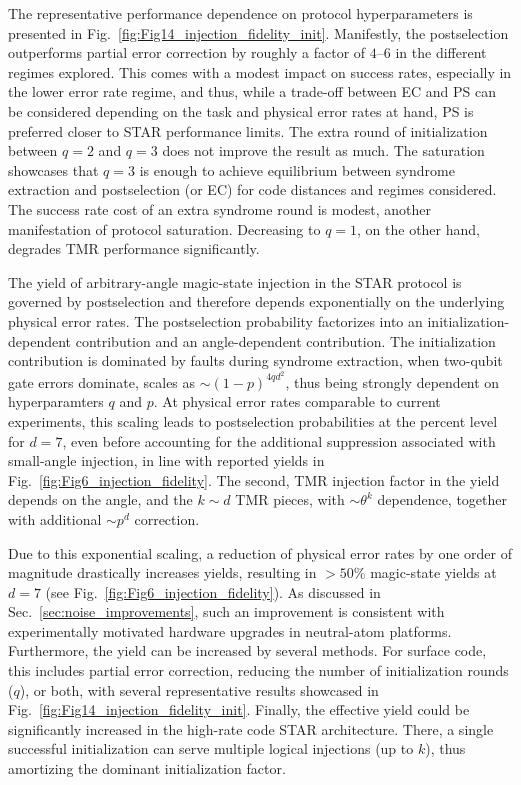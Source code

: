 \documentclass[aps, prx, reprint, superscriptaddress, longbibliography, floatfix]{revtex4-2}
\begin{document}
The representative performance dependence on protocol hyperparameters is presented in Fig.~\ref{fig:Fig14_injection_fidelity_init}. Manifestly, the postselection outperforms partial error correction by roughly a factor of $4$--$6$ in the different regimes explored. This comes with a modest impact on success rates, especially in the lower error rate regime, and thus, while a trade-off between EC and PS can be considered depending on the task and physical error rates at hand, PS is preferred closer to STAR performance limits. The extra round of initialization between $q=2$ and $q=3$ does not improve the result as much. The saturation showcases that $q=3$ is enough to achieve equilibrium between syndrome extraction and postselection (or EC) for code distances and regimes considered. The success rate cost of an extra syndrome round is modest, another manifestation of protocol saturation. Decreasing to $q=1$, on the other hand, degrades TMR performance significantly.

The yield of arbitrary-angle magic-state injection in the STAR protocol is governed by postselection and therefore depends exponentially on the underlying physical error rates. The postselection probability factorizes into an initialization-dependent contribution and an angle-dependent contribution. The initialization contribution is dominated by faults during syndrome extraction, when two-qubit gate errors dominate, scales as $\sim (1-p)^{ 4 q d^{2}}$, thus being strongly dependent on hyperparamters $q$ and $p$. At physical error rates comparable to current experiments, this scaling leads to postselection probabilities at the percent level for $d=7$, even before accounting for the additional suppression associated with small-angle injection, in line with reported yields in Fig.~\ref{fig:Fig6_injection_fidelity}. The second, TMR injection factor in the yield depends on the angle, and the $k\sim d$ TMR pieces, with $\sim \theta^{k}$ dependence, together with additional $\sim p^{d}$ correction.

Due to this exponential scaling, a reduction of physical error rates by one order of magnitude drastically increases yields, resulting in $>50\%$ magic-state yields at $d=7$ (see Fig.~\ref{fig:Fig6_injection_fidelity}). As discussed in Sec.~\ref{sec:noise_improvements}, such an improvement is consistent with experimentally motivated hardware upgrades in neutral-atom platforms. Furthermore, the yield can be increased by several methods. For surface code, this includes partial error correction, reducing the number of initialization rounds ($q$), or both, with several representative results showcased in Fig.~\ref{fig:Fig14_injection_fidelity_init}. Finally, the effective yield could be significantly increased in the high-rate code STAR architecture. There, a single successful initialization can serve multiple logical injections (up to $k$), thus amortizing the dominant initialization factor.
\end{document}

